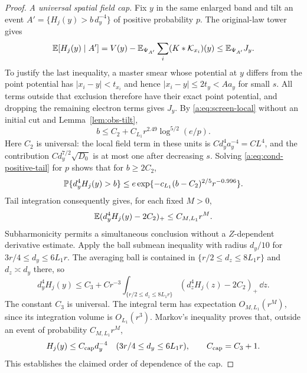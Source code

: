 \begin{proof}
\emph{A universal spatial field cap.}
Fix $y$ in the same enlarged band and tilt an event
$A'=\{H_j(y)>b\,d_y^{-4}\}$ of positive probability $p$.
The original-law tower gives
\[
 \mathbb E[H_j(y)\mid A']
  =V(y)-\mathbb E_{\Psi_{A'}}\sum_i(K*\mathcal K_{x_i})(y)
  \le\mathbb E_{\Psi_{A'}}J_y.
\]
To justify the last inequality, a master smear whose potential at
$y$ differs from the point potential has
$|x_i-y|<t_{x_i}$ and hence $|x_i-y|\le2t_y<Aa_y$ for small
$s$. All terms outside that exclusion therefore have their exact
point potential, and dropping the remaining electron terms gives
$J_y$. By \eqref{a:eq:screen-local} without an initial cut and
Lemma~\ref{lem:obs-tilt},
\begin{equation}\label{a:eq:cond-positive-tail}
 b\le C_2+C_{L_1}r^{2.49}\log^{5/2}(e/p).
\end{equation}
Here $C_2$ is universal: the local field term in these units is
$C d_y^4a_y^{-4}=CL^4$, and the contribution
$C d_y^{7/2}\sqrt{D_0}$ is at most one after decreasing $s$.
Solving \eqref{a:eq:cond-positive-tail} for $p$ shows that for
$b\ge2C_2$,
\[
 \mathbb P\{d_y^4H_j(y)>b\}
   \le e\exp\{-c_{L_1}(b-C_2)^{2/5}r^{-0.996}\}.
\]
Tail integration consequently gives, for each fixed $M>0$,
\[
 \mathbb E(d_y^4H_j(y)-2C_2)_+\le C_{M,L_1}r^M.
\]
Subharmonicity permits a simultaneous conclusion without a
$Z$-dependent derivative estimate. Apply the ball submean inequality
with radius $d_y/10$ for $3r/4\le d_y\le6L_1r$. The averaging ball
is contained in $\{r/2\le d_z\le8L_1r\}$ and $d_z\asymp d_y$
there, so
\[
 d_y^4H_j(y)\le C_3+Cr^{-3}
   \int_{\{r/2\le d_z\le8L_1r\}}
                (d_z^4H_j(z)-2C_2)_+\,\dd z.
\]
The constant $C_3$ is universal. The integral term has expectation
$O_{M,L_1}(r^M)$, since its integration volume is $O_{L_1}(r^3)$.
Markov's inequality proves that, outside an event of probability
$C_{M,L_1}r^M$,
\begin{equation}\label{a:eq:cond-cap}
 H_j(y)\le C_{\rm cap}d_y^{-4}
       \quad(3r/4\le d_y\le6L_1r),\qquad C_{\rm cap}=C_3+1.
\end{equation}
This establishes the claimed order of dependence of the cap.


\end{proof}
